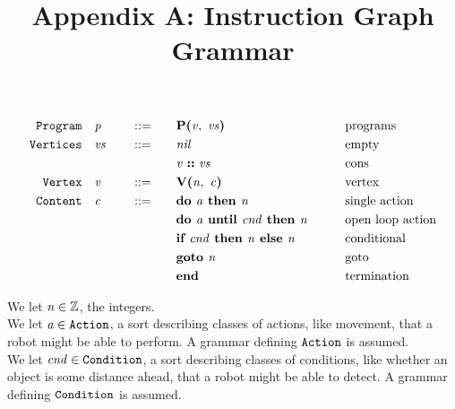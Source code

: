 \documentclass[12pt]{article}
\title{Appendix A: Instruction Graph Grammar}
\author{}
\date{}
\begin{document}
\maketitle

\thispagestyle{simple}

\begin{alignat*}{4}
  \mathtt{Program}\quad
    &\mathit{p}\quad & &::=\quad &
      &\textbf{P(}\mathit{v},\ \mathit{vs}\textbf{)}\qquad & &\text{programs}\\
  \mathtt{Vertices}\quad
    &\mathit{vs}\quad & &::=\quad &
      &\mathit{nil}\qquad & &\text{empty}\\
  &&&&&\mathit{v}\ \textbf{::}\ \mathit{vs}\qquad & &\text{cons}\\
  \mathtt{Vertex}\quad
    &\mathit{v}\quad & &::=\quad &
      &\textbf{V(}\mathit{n},\ \mathit{c}\textbf{)}\qquad & &\text{vertex}\\
  \mathtt{Content}\quad
    &\mathit{c}\quad & &::=\quad &
      &\textbf{do }\mathit{a}\textbf{ then }\mathit{n}\qquad & &\text{single action}\\
  &&&&&\textbf{do }\mathit{a}\textbf{ until }\mathit{cnd}\textbf{ then }\mathit{n}\qquad & &\text{open loop action}\\
  &&&&&\textbf{if }\mathit{cnd}\textbf{ then }\mathit{n}\textbf{ else }\mathit{n}\qquad & & \text{conditional}\\
  &&&&&\textbf{goto }\mathit{n}\qquad & &\text{goto}\\
  &&&&&\textbf{end}\qquad & &\text{termination}
\end{alignat*}

We let $\mathit{n} \in \mathbb{Z}$, the integers.\\

We let $\mathit{a} \in \mathtt{Action}$, a sort describing classes of actions,
like movement, that a robot might be able to perform. A grammar defining
$\mathtt{Action}$ is assumed.\\

We let $\mathit{cnd} \in \mathtt{Condition}$, a sort describing classes of
conditions, like whether an object is some distance ahead, that a robot might be
able to detect. A grammar defining $\mathtt{Condition}$ is assumed.\\
\end{document}
